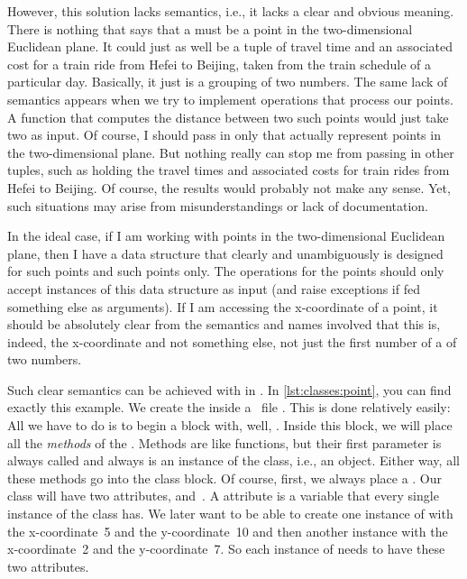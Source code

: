 However, this solution lacks semantics, i.e., it lacks a clear and obvious meaning.
There is nothing that says that a  must be a point in the two-dimensional Euclidean plane.
It could just as well be a tuple of travel time and an associated cost for a train ride from Hefei to Beijing, taken from the train schedule of a particular day.
Basically, it just is a grouping of two numbers.
The same lack of semantics appears when we try to implement operations that process our points.
A function that computes the distance between two such points would just take two  as input.
Of course, I should pass in only  that actually represent points in the two-dimensional plane.
But nothing really can stop me from passing in other tuples, such as  holding the travel times and associated costs for train rides from Hefei to Beijing.
Of course, the results would probably not make any sense.
Yet, such situations may arise from misunderstandings or lack of documentation.

In the ideal case, if I am working with points in the two-dimensional Euclidean plane, then I have a data structure that clearly and unambiguously is designed for such points and such points only.
The operations for the points should only accept instances of this data structure as input (and raise exceptions if fed something else as arguments).
If I am accessing the x\nobreakdashes-coordinate of a point, it should be absolutely clear from the semantics and names involved that this is, indeed, the x\nobreakdashes-coordinate and not something else, not just the first number of a  of two numbers.

Such clear semantics can be achieved with  in \python.
In \cref{lst:classes:point}, you can find exactly this example.
We create the  inside a \python\ file .
This is done relatively easily:
All we have to do is to begin a block with, well, .
Inside this block, we will place all the \emph{methods} of the .
Methods are like functions, but their first parameter is always called  and always is an instance of the class, i.e., an object.
Either way, all these methods go into the class block.
Of course, first, we always place a .%
%
%
%
Our class  will have two attributes,  and~.
A attribute is a variable that every single instance of the class has.
We later want to be able to create one instance of  with the x\nobreakdashes-coordinate~5 and the y\nobreakdashes-coordinate~10 and then another instance with the x\nobreakdashes-coordinate~2 and the y\nobreakdashes-coordinate~7.
So each instance of  needs to have these two attributes.

